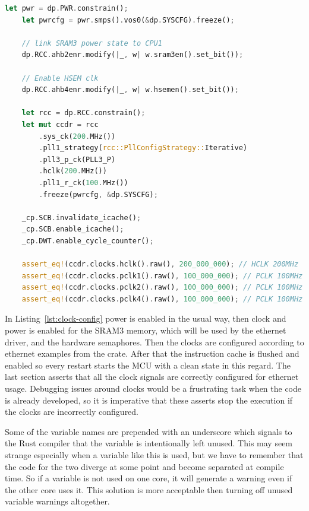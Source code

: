 \begin{lstlisting}[language=Rust,frame=single,float=!ht,style=customrust,label={lst:clock-config},caption={Initialization of Clocks, Resets, and Power Sources}]
    let pwr = dp.PWR.constrain();
    let pwrcfg = pwr.smps().vos0(&dp.SYSCFG).freeze();

    // link SRAM3 power state to CPU1
    dp.RCC.ahb2enr.modify(|_, w| w.sram3en().set_bit());

    // Enable HSEM clk
    dp.RCC.ahb4enr.modify(|_, w| w.hsemen().set_bit());

    let rcc = dp.RCC.constrain();
    let mut ccdr = rcc
        .sys_ck(200.MHz())
        .pll1_strategy(rcc::PllConfigStrategy::Iterative)
        .pll3_p_ck(PLL3_P)
        .hclk(200.MHz())
        .pll1_r_ck(100.MHz())
        .freeze(pwrcfg, &dp.SYSCFG);

    _cp.SCB.invalidate_icache();
    _cp.SCB.enable_icache();
    _cp.DWT.enable_cycle_counter();

    assert_eq!(ccdr.clocks.hclk().raw(), 200_000_000); // HCLK 200MHz
    assert_eq!(ccdr.clocks.pclk1().raw(), 100_000_000); // PCLK 100MHz
    assert_eq!(ccdr.clocks.pclk2().raw(), 100_000_000); // PCLK 100MHz
    assert_eq!(ccdr.clocks.pclk4().raw(), 100_000_000); // PCLK 100MHz
\end{lstlisting}

In Listing~\ref{lst:clock-config} power is enabled in the usual way, then clock and power is enabled for the SRAM3 memory, which will be used by the ethernet driver, and the hardware semaphores. Then the clocks are configured according to ethernet examples from the  crate. \cite{HalExamples} After that the instruction cache is flushed and enabled so every restart starts the MCU with a clean state in this regard. The last section asserts that all the clock signals are correctly configured for ethernet usage. Debugging issues around clocks would be a frustrating task when the code is already developed, so it is imperative that these asserts stop the execution if the clocks are incorrectly configured.

Some of the variable names are prepended with an underscore which signals to the Rust compiler that the variable is intentionally left unused. This may seem strange especially when a variable like this is used, but we have to remember that the code for the two diverge at some point and become separated at compile time. So if a variable is not used on one core, it will generate a warning even if the other core uses it. This solution is more acceptable then turning off unused variable warnings altogether.

